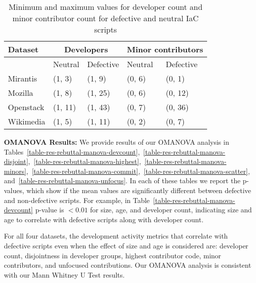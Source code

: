 \documentclass[smallextended]{svjour3}       %
\begin{document}
\begin{table}[]
\captionsetup{justification=centering}
\caption{Minimum and maximum values for developer count and minor contributor count for defective and neutral IaC scripts}
\label{table-res-rq1-minmax}  
\begin{tabular}{p{2cm} | p{2cm} p{2cm}| p{2cm} p{2cm}}
\hline 
\textbf{Dataset} & \multicolumn{2}{c|}{\textbf{Developers}} & \multicolumn{2}{c}{\textbf{Minor contributors}}  \\
\hline 
            & Neutral & Defective  & Neutral & Defective \\
\hline 
Mirantis    & (1, 3)  & (1, 9)     & (0, 6)  & (0, 1) \\
Mozilla     & (1, 8)  & (1, 25)    & (0, 6)  & (0, 12) \\
Openstack   & (1, 11) & (1, 43)    & (0, 7)  & (0, 36) \\
Wikimedia   & (1, 5)  & (1, 11)    & (0, 2)  & (0, 7) \\
\hline 
\end{tabular}
\end{table}



\textbf{OMANOVA Results:} We provide results of our OMANOVA analysis in Tables~\ref{table-res-rebuttal-manova-devcount},~\ref{table-res-rebuttal-manova-disjoint},~\ref{table-res-rebuttal-manova-highest},~\ref{table-res-rebuttal-manova-minors},~\ref{table-res-rebuttal-manova-commit},~\ref{table-res-rebuttal-manova-scatter}, and~\ref{table-res-rebuttal-manova-unfocus}. In each of these tables we report the p-values, which show if the mean values are significantly different between defective and non-defective scripts. For example, in Table~\ref{table-res-rebuttal-manova-devcount} p-value is $< 0.01$ for size, age, and developer count, indicating size and age to correlate with defective scripts along with developer count.    

For all four datasets, the development activity metrics that correlate with defective scripts even when the effect of size and age is considered are: developer count, disjointness in developer groups, highest contributor code, minor contributors, and unfocused contributions. Our OMANOVA analysis is consistent with our Mann Whitney U Test results. 
\end{document}
